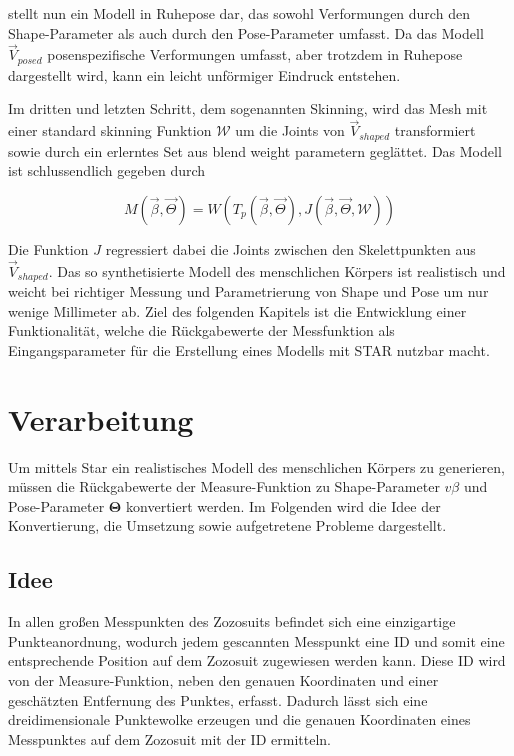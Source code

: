 stellt nun ein Modell in Ruhepose dar, das sowohl Verformungen durch den Shape-Parameter als auch durch den
Pose-Parameter umfasst. Da das Modell $\vec{V}_{posed}$ posenspezifische Verformungen umfasst, aber trotzdem in Ruhepose dargestellt
wird, kann ein leicht unförmiger Eindruck entstehen. 

Im dritten und letzten Schritt, dem sogenannten Skinning, wird das Mesh mit einer standard skinning Funktion $\mathcal{W}$  um die Joints von $\vec{V}_{shaped}$ transformiert sowie durch ein erlerntes Set aus blend weight parametern geglättet. Das Modell ist schlussendlich gegeben durch

\begin{equation}\label{eq:Star_Model}
  M(\vec{\beta},\vec{\Theta})=W(T_p(\vec{\beta},\vec{\Theta}), J(\vec{\beta},\vec{\Theta}, \mathcal{W}))
\end{equation}

Die Funktion $J$ regressiert dabei die Joints zwischen den Skelettpunkten aus $\vec{V}_{shaped}$. Das so synthetisierte Modell des
menschlichen Körpers ist realistisch und weicht bei richtiger Messung und Parametrierung von Shape und Pose um nur wenige
Millimeter ab. Ziel des folgenden Kapitels ist die Entwicklung einer Funktionalität, welche die Rückgabewerte der
Messfunktion als Eingangsparameter für die Erstellung eines Modells mit STAR nutzbar macht.

\section{Verarbeitung}

Um mittels Star ein realistisches Modell des menschlichen Körpers zu generieren, müssen die Rückgabewerte der
Measure-Funktion zu Shape-Parameter $v{\beta}$ und Pose-Parameter $\boldsymbol{\Theta}$ konvertiert werden. Im Folgenden wird die Idee der Konvertierung, die Umsetzung sowie aufgetretene
Probleme dargestellt.

\subsection{Idee}

In allen großen Messpunkten des Zozosuits befindet sich eine einzigartige Punkteanordnung, wodurch jedem gescannten
Messpunkt eine ID und somit eine entsprechende Position auf dem Zozosuit zugewiesen werden kann. Diese ID wird von der Measure-Funktion, neben den genauen Koordinaten und einer geschätzten Entfernung des
Punktes, erfasst. Dadurch lässt sich eine dreidimensionale Punktewolke erzeugen und die genauen Koordinaten eines
Messpunktes auf dem Zozosuit mit der ID ermitteln.

